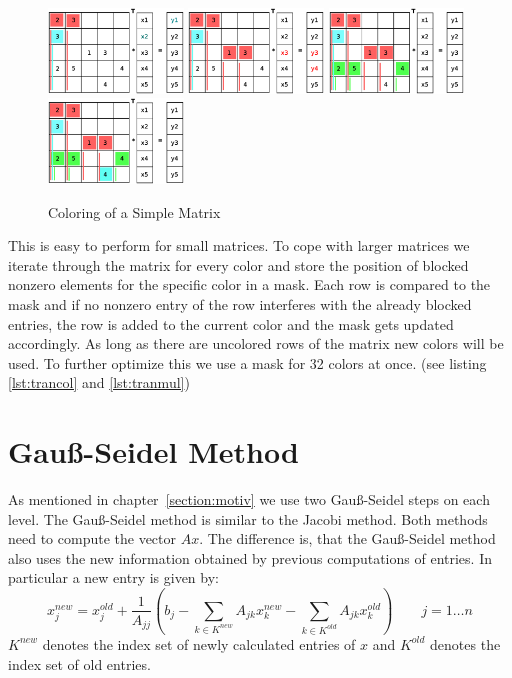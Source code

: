 \documentclass[a4paper,11pt]{scrartcl}
\begin{document}
\begin{figure}[ht]
\includegraphics[width=0.32\textwidth]{graphic/coloringT7.eps}
\includegraphics[width=0.32\textwidth]{graphic/coloringT8.eps}\hfill\vline\hfill
\includegraphics[width=0.32\textwidth]{graphic/coloringT9.eps}\hfill\vline\hfill
\includegraphics[width=0.32\textwidth]{graphic/coloringT10.eps}
\caption{Coloring of a Simple Matrix}\label{figure:coloring}
\end{figure}

This is easy to perform for small matrices. To cope with larger matrices we
iterate through the matrix for every color and store the position of blocked
nonzero elements for the specific color in a mask.
Each row is compared to the mask and if no nonzero entry of the row interferes
with the already blocked entries, the row is added to the current color and the
mask gets updated accordingly.
As long as there are uncolored rows of the matrix new colors will be used.
To further optimize this we use a mask for 32 colors at once. (see listing \ref{lst:trancol}
and \ref{lst:tranmul})



\section{Gauß-Seidel Method} \label{section:gs}
As mentioned in chapter~\ref{section:motiv} we use two Gauß-Seidel steps on
each level. The Gauß-Seidel method is similar to the Jacobi method.
Both methods need to compute the vector $Ax$. The difference is, that the
Gauß-Seidel method also uses the new information obtained by previous
computations of entries.
In particular a new entry is given by:
$$ x_j^{new} = x_j^{old} + \frac{1}{A_{jj}} \left(b_{j} -
  \sum_{k \in K^{new}}A_{jk} x_k^{new} - \sum_{k \in K^{old}}A_{jk} x_k^{old}
  \right) \qquad j = 1 \dots n$$
$K^{new}$ denotes the index set of newly calculated entries
of $x$ and $K^{old}$ denotes the index set of old entries.
\cite{iterative}
\end{document}
